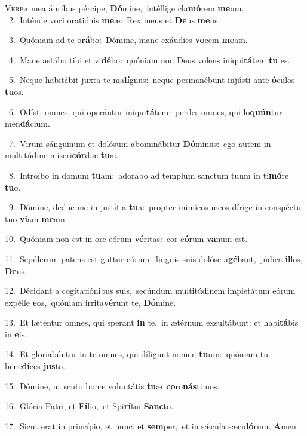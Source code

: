 \lettrine{\initial\textcolor{\initialcolor}{V}}{erba} mea áuribus pércipe, \textbf{Dó}\-mine,~\star intéllige cla\-\textbf{mó}\-rem \textbf{me}\-um.\\
{\numbfont\textcolor{\numbcolor}{~2.}}~Inténde voci oratiónis \textbf{me}\-æ:~\star Rex meus et \textbf{De}\-us \textbf{me}\-us.\par
{\numbfont\textcolor{\numbcolor}{~3.}}~Quóniam ad te o\-\textbf{rá}\-bo:~\star Dómine, mane exáudies \textbf{vo}\-cem \textbf{me}\-am.\par
{\numbfont\textcolor{\numbcolor}{~4.}}~Mane astábo tibi et vi\-\textbf{dé}\-bo:~\star quóniam non Deus volens iniqui\-\textbf{tá}\-tem \textbf{tu} es.\par
{\numbfont\textcolor{\numbcolor}{~5.}}~Neque habitábit juxta te ma\-\textbf{lí}\-gnus:~\star neque permanébunt injústi ante \textbf{ó}\-culos \textbf{tu}\-os.\par
{\numbfont\textcolor{\numbcolor}{~6.}}~Odísti omnes, qui operántur iniqui\-\textbf{tá}\-tem:~\star perdes omnes, qui lo\-\textbf{quún}\-tur men\-\textbf{dá}\-cium.\par
{\numbfont\textcolor{\numbcolor}{~7.}}~Virum sánguinum et dolósum abominábitur \textbf{Dó}\-minus:~\star ego autem in multitúdine miseri\-\textbf{cór}\-diæ \textbf{tu}\-æ.\par
{\numbfont\textcolor{\numbcolor}{~8.}}~Introíbo in domum \textbf{tu}\-am:~\star adorábo ad templum sanctum tuum in ti\-\textbf{mó}\-re \textbf{tu}\-o.\par
{\numbfont\textcolor{\numbcolor}{~9.}}~Dómine, deduc me in justítia \textbf{tu}\-a:~\star propter inimícos meos dírige in conspéctu tuo \textbf{vi}\-am \textbf{me}\-am.\par
{\numbfont\textcolor{\numbcolor}{10.}}~Quóniam non est in ore eórum \textbf{vé}\-ritas:~\star cor e\-\textbf{ó}\-rum \textbf{va}\-num est.\par
{\numbfont\textcolor{\numbcolor}{11.}}~Sepúlcrum patens est guttur eórum,~\dagger linguis suis dolóse a\-\textbf{gé}\-bant,~\star júdica \textbf{il}\-los, \textbf{De}\-us.\par
{\numbfont\textcolor{\numbcolor}{12.}}~Décidant a cogitatiónibus suis,~\dagger secúndum multitúdinem impietátum eórum expélle \textbf{e}\-os,~\star quóniam irrita\-\textbf{vé}\-runt te, \textbf{Dó}\-mine.\par
{\numbfont\textcolor{\numbcolor}{13.}}~Et læténtur omnes, qui sperant \textbf{in} te,~\star in ætérnum exsultábunt: et habi\-\textbf{tá}\-bis in \textbf{e}\-is.\par
{\numbfont\textcolor{\numbcolor}{14.}}~Et gloriabúntur in te omnes, qui díligunt nomen \textbf{tu}\-um:~\star quóniam tu bene\-\textbf{dí}\-ces \textbf{jus}\-to.\par
{\numbfont\textcolor{\numbcolor}{15.}}~Dómine, ut scuto bonæ voluntátis \textbf{tu}\-æ~\star \textbf{co}\-ro\-\textbf{nás}\-ti nos.\par
{\numbfont\textcolor{\numbcolor}{16.}}~Glória Patri, et \textbf{Fí}\-lio,~\star et Spi\-\textbf{rí}\-tui \textbf{Sanc}\-to.\par
{\numbfont\textcolor{\numbcolor}{17.}}~Sicut erat in princípio, et nunc, et \textbf{sem}\-per,~\star et in sǽcula sæcu\-\textbf{ló}\-rum. \textbf{A}\-men.\par
